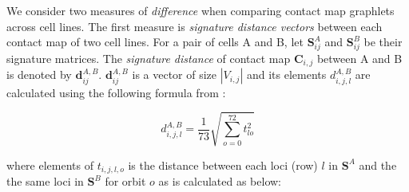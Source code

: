 \documentclass[]{article}
\begin{document}
%


We consider two measures of \textit{difference} when comparing contact
map graphlets across cell lines. 
The first measure is \textit{signature distance vectors} between
each contact map of two cell lines. 
For a pair of cells A and B, let 
$\mathbf{S}^A_{ij}$  and $\mathbf{S}^B_{ij}$ be their
signature matrices. The \textit{signature distance} of
contact map $\mathbf{C}_{i,j}$ between A and B is denoted
by $\mathbf{d}^{\scriptscriptstyle A,B}_{ij}$. $\mathbf{d}^{\scriptscriptstyle A,B}_{ij}$ 
is a vector of size $|V_{i,j}|$
and its elements $d^{\scriptscriptstyle A,B}_{i,j,l}$ are
calculated using the following formula from \cite{prvzulj2007biological}:

\begin{equation}
    d^{\scriptscriptstyle A,B}_{i,j,l} = 
    \frac{1}{73}\sqrt{\sum_{o=0}^{72}{t_{lo}^2}}
    \label{eq:distance_total}
\end{equation}

where elements of $t_{i,j,l,o}$ is the
distance between each
loci (row) $l$ in $\mathbf{S}^A$ and the the same loci in 
$\mathbf{S}^B$ for
orbit $o$ as is calculated as below:
\end{document}
